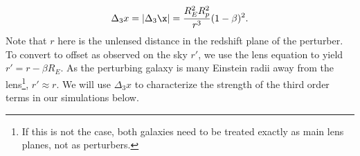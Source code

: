 \begin{equation}
\Delta_3 x = | \Delta_3 \x| = \frac{R_E^2 R_p^2}{r^3} (1 - \beta)^2. 
\end{equation}
Note that $r$ here is the unlensed distance in the redshift plane of the perturber. To convert to offset as observed on the sky $r'$, we use the lens equation to yield $r' = r - \beta R_E$. As the perturbing galaxy is many Einstein radii away from the lens\footnote{If this is not the case, both galaxies need to be treated exactly as main lens planes, not as perturbers.}, $r' \approx r$. We will use $\Delta_3 x$ to characterize the strength of the third order terms in our simulations below.
  
  
  